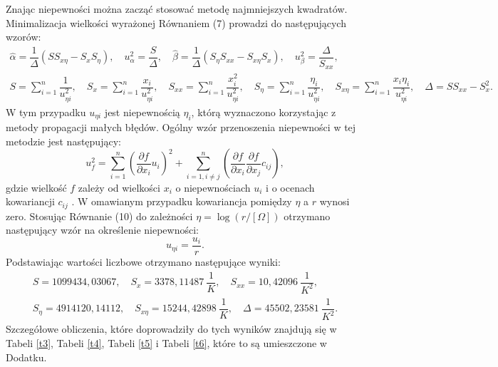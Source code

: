 \documentclass[10pt,a4paper]{article}
\begin{document}
Znając niepewności można zacząć stosować metodę najmniejszych kwadratów. Minimalizacja wielkości wyrażonej Równaniem (7) prowadzi do następujących wzorów:
\begin{eqnarray*}
 \hat{\alpha}=\dfrac{1}{\Delta}\left(SS_{x\eta}-S_{x}S_{\eta}\right), \quad  u_{\alpha}^2=\dfrac{S}{\Delta}, \quad \hat{\beta}=\dfrac{1}{\Delta}\left(S_{\eta}S_{xx}-S_{x \eta}S_{x}\right), \quad u^2_{\beta}=\dfrac{\Delta}{S_{xx}},  \\
 S=\sum_{i=1}^{n}\dfrac{1}{u_{\eta i}^2}, \quad S_{x}=\sum_{i=1}^{n}\dfrac{x_{i}}{u_{\eta i}^2}, \quad S_{xx}=\sum_{i=1}^{n}\dfrac{x_{i}^2}{u_{\eta i}^2}, \quad S_{\eta}=\sum_{i=1}^{n}\dfrac{\eta_{i}}{u_{\eta i}^2}, \quad S_{x \eta}=\sum_{i=1}^{n}\dfrac{x_{i}\eta_{i}}{u_{\eta i}^2}, \quad \Delta=SS_{xx}-S_{x}^2.
 \end{eqnarray*}
 W tym przypadku $u_{\eta i}$ jest niepewnością $\eta_{i}$, którą wyznaczono korzystając z metody propagacji małych błędów. Ogólny wzór przenoszenia niepewności w tej metodzie jest następujący:
 \begin{equation}
 u_{f}^2=\sum_{i=1}^n \left( \dfrac{\partial f}{\partial x_{i}}u_{i}\right)^2+\sum_{i=1, i\neq j}^n \left( \dfrac{\partial f}{\partial x_{i}}\dfrac{\partial f}{\partial x_{j}}c_{ij}\right),
 \end{equation}
 gdzie wielkość $f$ zależy od wielkości $x_{i}$ o niepewnościach $u_{i}$ i o ocenach kowariancji $c_{ij}$ \cite{tay2}. W omawianym przypadku kowariancja pomiędzy $\eta$ a $r$ wynosi zero. Stosując Równanie (10) do zależności $\eta=\log{\left(r/[\Omega]\right)}$ otrzymano następujący wzór na określenie niepewności:
 \begin{equation}
 u_{\eta i}=\dfrac{u_{i}}{r}.
 \end{equation}
 Podstawiając wartości liczbowe otrzymano następujące wyniki:
 \begin{eqnarray*}
 S=1099434,03067, \quad S_{x}=3378,11487 \ \dfrac{1}{K}, \quad S_{xx}=10,42096 \ \dfrac{1}{K^2}, \\
  S_{\eta}=4914120,14112, \quad S_{x \eta}=15244,42898 \ \dfrac{1}{K}, \quad \Delta=45502,23581 \ \dfrac{1}{K^2}.
 \end{eqnarray*}
 Szczegółowe obliczenia, które doprowadziły do tych wyników znajdują się w Tabeli \ref{t3}, Tabeli \ref{t4}, Tabeli \ref{t5} i Tabeli \ref{t6}, które to są umieszczone w Dodatku.
 
\end{document}

